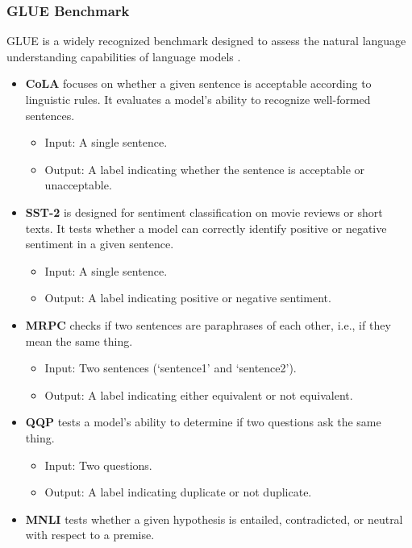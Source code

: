 \documentclass{article} %
\theoremstyle{plain}
\theoremstyle{definition}
\begin{document}
\subsubsection{GLUE Benchmark}
GLUE is a widely recognized benchmark designed to assess the natural language understanding capabilities of language models \citep{wang2018glue}.
\begin{itemize}[topsep=0pt,itemsep=4pt,parsep=0pt, partopsep=0pt, leftmargin=*]
    \item \textbf{CoLA} focuses on whether a given sentence is acceptable according to linguistic rules. It evaluates a model's ability to recognize well-formed sentences.
    \begin{itemize}
        \item[$\rhd$] Input: A single sentence.
        \item[\ding{73}] Output: A label indicating whether the sentence is acceptable or unacceptable.
    \end{itemize}
    \item \textbf{SST-2} is designed for sentiment classification on movie reviews or short texts. It tests whether a model can correctly identify positive or negative sentiment in a given sentence.
    \begin{itemize}
        \item[$\rhd$] Input: A single sentence. 
        \item[\ding{73}] Output: A label indicating positive or negative sentiment.
    \end{itemize}
    \item \textbf{MRPC} checks if two sentences are paraphrases of each other, i.e., if they mean the same thing.
    \begin{itemize}
        \item[$\rhd$] Input: Two sentences (`sentence1' and `sentence2'). 
        \item[\ding{73}] Output: A label indicating either equivalent or not equivalent. 
    \end{itemize}
    \item \textbf{QQP} tests a model's ability to determine if two questions ask the same thing.
    \begin{itemize}
        \item[$\rhd$] Input: Two questions. 
        \item[\ding{73}] Output: A label indicating duplicate or not duplicate.
    \end{itemize}
    \item \textbf{MNLI} tests whether a given hypothesis is entailed, contradicted, or neutral with respect to a premise. 

\end{itemize}
\end{document}
